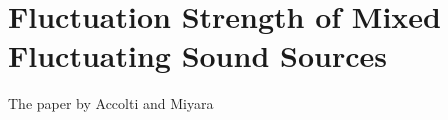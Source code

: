 \section{Fluctuation Strength of Mixed Fluctuating Sound Sources}

The paper by Accolti and Miyara \cite{Accolti2009Fluctuation}

